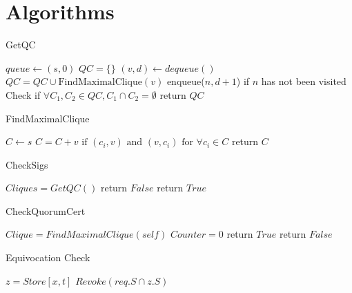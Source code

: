 \section*{Algorithms}
%
%
\label{GetQC}
\begin{algorithm}
  \caption{GetQC}
  \SetAlgoNoLine
  $queue \leftarrow {(s, 0)}$\;
  $QC = \{\}$\;
  {
    $(v, d) \leftarrow dequeue()$\;
    $QC = QC \cup \text{FindMaximalClique}(v)$\;
    {
      enqueue($n, d + 1$) if $n$ has not been visited\;
    }
  }
  Check if $\forall C_1, C_2 \in QC, C_1 \cap C_2 = \emptyset$\;
  return $QC$
\end{algorithm}

\begin{algorithm}
  \caption{FindMaximalClique}
  \SetAlgoNoLine
  $C \leftarrow {s}$\;
  {
    $C = C + {v} \text{ if } (c_i, v) \text{ and } (v, c_i)
    \text{ for } \forall c_i \in C$\;
  }
  return $C$
\end{algorithm}

\label{CheckSigs}
\begin{algorithm}
  \caption{CheckSigs}
  \SetAlgoNoLine
  $Cliques = GetQC()$\;
  {
    {
      return $False$\;
    }
  }
  return $True$\;
\end{algorithm}

\label{CheckQuorumCert}
\begin{algorithm}
  \caption{CheckQuorumCert}
  \SetAlgoNoLine
  $Clique = FindMaximalClique(self)$\;
  $Counter = 0$\;
  {
  }
  {
    return $True$\;
  }{
    return $False$\;
  }
\end{algorithm}

\label{CheckEquivocation}
\begin{algorithm}
  \caption{Equivocation Check}
  \SetAlgoNoLine
  $z = Store[x, t]$\;
  {
    $Revoke(req.S \cap z.S)$\;
  }
\end{algorithm}

